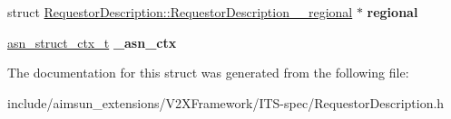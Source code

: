\begin{DoxyCompactItemize}
\item 
struct \hyperlink{structRequestorDescription_1_1RequestorDescription____regional}{Requestor\+Description\+::\+Requestor\+Description\+\_\+\+\_\+regional} $\ast$ {\bfseries regional}\hypertarget{structRequestorDescription_a342fa745b7eb561fb8dbd998f82d60d8}{}\label{structRequestorDescription_a342fa745b7eb561fb8dbd998f82d60d8}

\item 
\hyperlink{structasn__struct__ctx__s}{asn\+\_\+struct\+\_\+ctx\+\_\+t} {\bfseries \+\_\+asn\+\_\+ctx}\hypertarget{structRequestorDescription_accf897c3aa9794f20934186d3d659482}{}\label{structRequestorDescription_accf897c3aa9794f20934186d3d659482}

\end{DoxyCompactItemize}


The documentation for this struct was generated from the following file\+:\begin{DoxyCompactItemize}
\item 
include/aimsun\+\_\+extensions/\+V2\+X\+Framework/\+I\+T\+S-\/spec/Requestor\+Description.\+h\end{DoxyCompactItemize}
